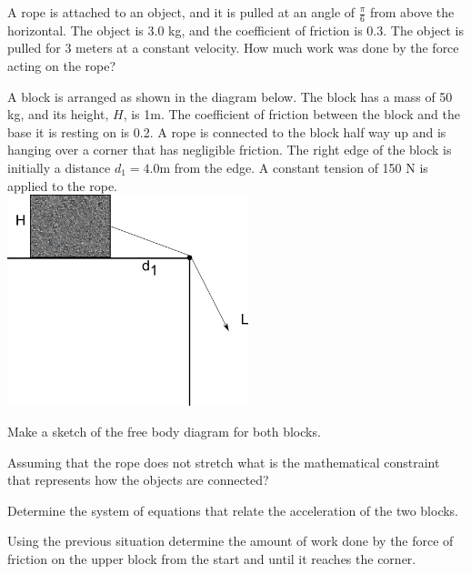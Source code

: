 
\begin{problem}
\item A rope is attached to an object, and it is pulled at an angle of
  $\frac{\pi}{6}$ from above the horizontal. The object is 3.0 kg, and
  the coefficient of friction is 0.3. The object is pulled for 3
  meters at a constant velocity. How much work was done by the force
  acting on the rope?

  \vfill
\end{problem}


\begin{problem} 
\item A block is arranged as shown in the diagram below. The block has
  a mass of 50 kg, and its height, $H$, is 1m.  The coefficient of
  friction between the block and the base it is resting on is 0.2. A
  rope is connected to the block half way up and is hanging over a
  corner that has negligible friction. The right edge of the block is
  initially a distance $d_1=4.0$m from the edge. A constant
  tension of 150 N is applied to the rope. \\
  \includegraphics[width=7cm]{ink/week10/hangingBlocks}

  \begin{subproblem}
    \item Make a sketch of the free body diagram for both blocks.
      \vfill
    \item Assuming that the rope does not stretch what is the
      mathematical constraint that represents how the objects are
      connected? 
      \vfill
      \clearpage
    \item Determine the system of equations that relate the
      acceleration of the two blocks.
      \vfill
  \end{subproblem}

  \clearpage

\item Using the previous situation determine the amount of work done
  by the force of friction on the upper block from the start and until
  it reaches the corner.

  \vfill

\end{problem}

